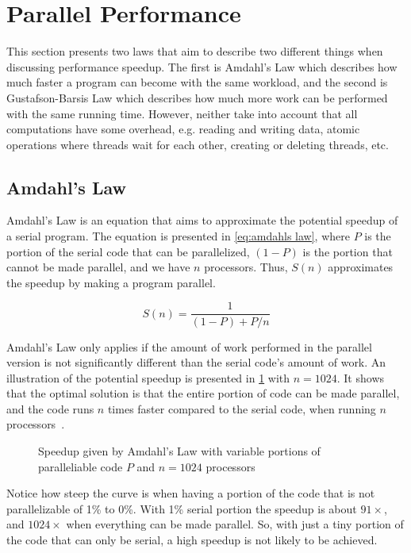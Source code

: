 \section{Parallel Performance}
\label{sec:parallel performance}

This section presents two laws that aim to describe two different things when discussing performance speedup.
The first is Amdahl's Law which describes how much faster a program can become with the same workload, and the second is Gustafson-Barsis Law which describes how much more work can be performed with the same running time.
However, neither take into account that all computations have some overhead, e.g. reading and writing data, atomic operations where threads wait for each other, creating or deleting threads, etc.

\subsection{Amdahl's Law}
\label{sec:amdahls law}

Amdahl's Law is an equation that aims to approximate the potential speedup of a serial program.
The equation is presented in \cref{eq:amdahls law}, where $P$ is the portion of the serial code that can be parallelized, $(1-P)$ is the portion that cannot be made parallel, and we have $n$ processors.
Thus, $S(n)$ approximates the speedup by making a program parallel.

\begin{equation}
  \label{eq:amdahls law}
  S(n) = \frac{1}{(1-P) + P/n}
\end{equation}

Amdahl's Law only applies if the amount of work performed in the parallel version is not significantly different than the serial code's amount of work.
An illustration of the potential speedup is presented in \cref{fig:amdahls law} with $n=1024$.
It shows that the optimal solution is that the entire portion of code can be made parallel, and the code runs $n$ times faster compared to the serial code, when running $n$ processors~\cite{farber2011cuda}.

\begin{figure}[htb]
  \centering
  
  \caption{Speedup given by Amdahl's Law with variable portions of paralleliable code $P$ and $n=1024$ processors}
  \label{fig:amdahls law}
\end{figure}

Notice how steep the curve is when having a portion of the code that is not parallelizable of 1\% to 0\%.
With 1\% serial portion the speedup is about $91\times$, and $1024\times$ when everything can be made parallel.
So, with just a tiny portion of the code that can only be serial, a high speedup is not likely to be achieved.

